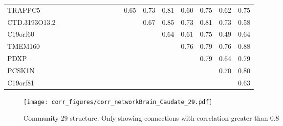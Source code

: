 \begin{longtable}{lrrrrrrrrrrrrrrrr}
TRAPPC5       &               &            &               &               &              &             &             &                &               &                0.65 &           0.73 &          0.81 &       0.60 &         0.75 &           0.62 &          0.75 \\
CTD.3193O13.2 &               &            &               &               &              &             &             &                &               &                     &           0.67 &          0.85 &       0.73 &         0.81 &           0.73 &          0.58 \\
C19orf60      &               &            &               &               &              &             &             &                &               &                     &                &          0.64 &       0.61 &         0.75 &           0.49 &          0.64 \\
TMEM160       &               &            &               &               &              &             &             &                &               &                     &                &               &       0.76 &         0.79 &           0.76 &          0.88 \\
PDXP          &               &            &               &               &              &             &             &                &               &                     &                &               &            &         0.79 &           0.64 &          0.79 \\
PCSK1N        &               &            &               &               &              &             &             &                &               &                     &                &               &            &              &           0.70 &          0.80 \\
C19orf81      &               &            &               &               &              &             &             &                &               &                     &                &               &            &              &                &          0.63 \\
\end{longtable}


\begin{figure}[h!]
\centering
\texttt{[image: corr\_figures/corr\_networkBrain\_Caudate\_29.pdf]}
\caption{Community 29 structure. Only showing connections with correlation greater than 0.8}
\end{figure}




